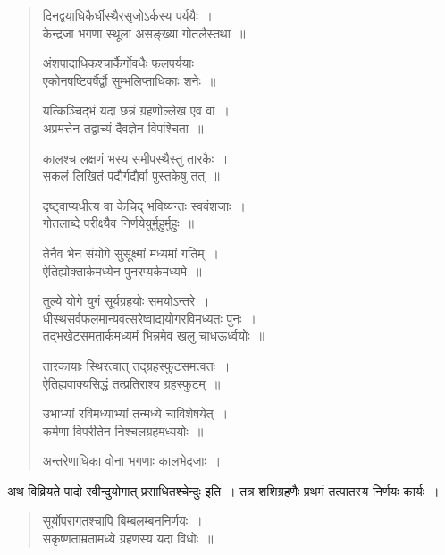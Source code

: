 \documentclass[11pt, openany]{book}
\begin{document}
\newpage
\begin{quote}
{\qt दिनद्वयाधिकैर्धीस्थैरसृजोऽर्कस्य पर्ययैः~।\\
केन्द्रजा भगणा स्थूला असङ्ख्या गोतलैस्तथा~॥

अंशपादाधिकश्चार्कैर्गोवधैः फलपर्ययाः~।\\
एकोनषष्टिवर्षैर्द्वौ सुम्भलिप्ताधिकाः शनेः~॥

यत्किञ्चिद्भं यदा छन्नं ग्रहणोल्लेख एव वा~।\\
अप्रमत्तेन तद्वाच्यं दैवज्ञेन विपश्चिता~॥

कालश्च लक्षणं भस्य समीपस्थैस्तु तारकैः~।\\
सकलं लिखितं पद्यैर्गद्यैर्वा पुस्तकेषु तत्~॥

दृष्ट्वाप्यधीत्य वा केचिद् भविष्यन्तः स्ववंशजाः~।\\
गोतलाब्दे परीक्ष्यैव निर्णयेयुर्मुहुर्मुहुः~॥

तेनैव भेन संयोगे सुसूक्ष्मां मध्यमां गतिम्~।\\
ऐतिह्योक्तार्कमध्येन पुनरप्यर्कमध्यमे~॥

तुल्ये योगे युगं सूर्यग्रहयोः समयोऽन्तरे~।\\
धीस्थसर्वफलमान्यवत्सरेष्वाद्ययोगरविमध्यतः पुनः~।\\
तद्भखेटसमतार्कमध्यमं भिन्नमेव खलु चाधऊर्ध्वयोः~॥

तारकायाः स्थिरत्वात् तद्ग्रहस्फुटसमत्वतः~।\\
ऐतिह्यवाक्यसिद्धं तत्प्रतिराश्य ग्रहस्फुटम्~॥

उभाभ्यां रविमध्याभ्यां तन्मध्ये चाविशेषयेत्~।\\
कर्मणा विपरीतेन निश्चलग्रहमध्ययोः~॥

अन्तरेणाधिका वोना भगणाः कालभेदजाः~।} 
\end{quote} 

\indent अथ विव्रियते पादो {\qt रवीन्दुयोगात् प्रसाधितश्चेन्दुः} इति~। तत्र शशिग्रहणैः प्रथमं तत्पातस्य निर्णयः कार्यः~।
\begin{quote}
{\qt सूर्योपरागतश्चापि बिम्बलम्बननिर्णयः~।\\
सकृष्णताम्रतामध्ये ग्रहणस्य यदा विधोः~॥}
\end{quote}
\end{document}
